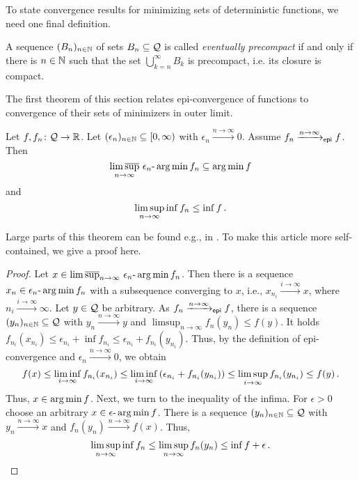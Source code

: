 To state convergence results for minimizing sets of deterministic functions, we need one final definition.
%
\begin{definition}
	A sequence $(B_n)_{n\in\mathbb{N}}$ of sets $B_n \subseteq \mathcal{Q}$ is called \emph{eventually precompact} if and only if there is $n\in\mathbb{N}$ such that the set 
$\bigcup_{k=n}^\infty B_k$ is precompact, i.e. its closure is compact.
\end{definition}
%
The first theorem of this section relates epi-convergence of functions to convergence of their sets of minimizers in outer limit.
%
\begin{theorem}\label{thm:convOfMini}
	Let $f,f_n \colon \mathcal{Q}\to\mathbb{R}$. Let $(\epsilon_n)_{n\in\mathbb{N}}\subseteq [0,\infty)$ with $\epsilon_n \xrightarrow{n\to\infty}0$. 
		Assume $f_n\xrightarrow{n\to\infty}_{\mathsf{epi}} f$.
		Then
		\begin{equation*}
			\operatorname*{lim\, \overline{sup}}_{n\to\infty}\, \epsilon_n\text{-}\operatorname*{arg\,min} f_n \subseteq \operatorname*{arg\,min} f
		\end{equation*}
		and
		\begin{equation*}
			\limsup_{n\to\infty} \inf f_n \leq \inf f
			\, .
		\end{equation*}
\end{theorem}
%
Large parts of this theorem can be found e.g., in \cite[chapter 7]{rockafellar98}. To make this article more self-contained, we give a proof here.
%
\begin{proof}
		Let $x \in \operatorname*{lim\, \overline{sup}}_{n\to\infty}\, \epsilon_n\text{-}\operatorname*{arg\,min} f_n$. Then there is a sequence $x_n \in \epsilon_{n}\text{-}\operatorname*{arg\,min} f_{n}$ with a subsequence converging to $x$, i.e., $x_{n_i} \xrightarrow{i\to\infty} x$, where $n_i\xrightarrow{i\to\infty}\infty$.
		Let $y\in\mathcal{Q}$ be arbitrary. As $f_n\xrightarrow{n\to\infty}_{\mathsf{epi}} f$, there is a sequence $(y_n)_{n\in\mathbb{N}}\subseteq\mathcal{Q}$ with $y_n\xrightarrow{n\to\infty}y$ and $\limsup_{n\to\infty} f_n(y_n) \leq f(y)$. 
		It holds $f_{n_i}(x_{n_i}) \leq \epsilon_{n_i} + \inf f_{n_i} \leq \epsilon_{n_i} + f_{n_i}(y_{n_i})$. Thus, by the definition of epi-convergence and $\epsilon_n \xrightarrow{n\to\infty} 0$, we obtain
		\begin{equation*}
		f(x) 
		\leq 
		\liminf_{i\to\infty} f_{n_i}(x_{n_i}) 
		\leq 
		\liminf_{i\to\infty} \left( \epsilon_{n_i} + f_{n_i}(y_{n_i}) \right)
		\leq 
		\limsup_{i\to\infty} f_{n_i}(y_{n_i}) 
		\leq 
		f(y)\, .
		\end{equation*}		
		Thus, $x \in \operatorname*{arg\,min} f$.
		Next, we turn to the inequality of the infima. For $\epsilon > 0$ choose an arbitrary $x\in\epsilon\text{-}\operatorname*{arg\,min} f$. There is a sequence $(y_n)_{n\in\mathbb{N}}\subseteq\mathcal{Q}$ with $y_n\xrightarrow{n\to\infty} x$ and $f_n(y_n)\xrightarrow{n\to\infty} f(x)$. Thus,
		\begin{equation*}
			\limsup_{n\to\infty} \inf f_n \leq \limsup_{n\to\infty} f_n(y_n) \leq \inf f + \epsilon
			\, .
		\end{equation*}
\end{proof}
